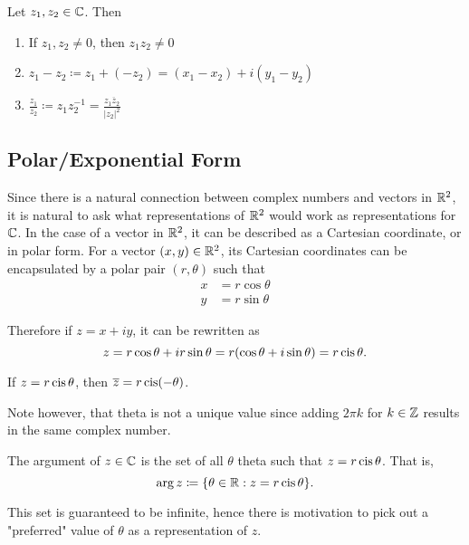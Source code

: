 \documentclass[../notes.tex]{subfiles}
\begin{document}
\begin{theorem}
    Let $z_1, z_2 \in \mathbb{C}$. Then
    \begin{enumerate}
        \item If $z_1, z_2 \neq 0$, then $z_1 z_2 \neq 0$
        \item $z_1 - z_2 \coloneq z_1 + (-z_2) = (x_1 - x_2) + i (y_1 - y_2)$
        \item $\displaystyle\frac{z_1}{z_2} \coloneq z_1 z_2^{-1} = \frac{z_1 \overline{z}_2}{|z_2|^2}$
    \end{enumerate}
\end{theorem}

\subsection{Polar/Exponential Form}

Since there is a natural connection between complex numbers and vectors in $\mathbb{R}^2$, it is natural to ask what representations of $\mathbb{R}^2$ would work as representations for $\mathbb{C}$. In the case of a vector in $\mathbb{R}^2$, it can be described as a Cartesian coordinate, or in polar form. For a vector $(x,y) \in \mathbb{R}^2$, its Cartesian coordinates can be encapsulated by a polar pair $(r, \theta)$ such that
\begin{align*}
    x &= r \cos \theta \\
    y &= r \sin \theta
\end{align*}

Therefore if $z = x + iy$, it can be rewritten as
\[
    z = r \cos \theta + i r \sin \theta = r (\cos \theta + i \sin \theta) = r \operatorname{cis} \theta
.\]
\begin{remark}
    If $z = r \operatorname{cis} \theta$, then $\overline{z} = r \operatorname{cis}(-\theta)$.
\end{remark}

Note however, that theta is not a unique value since adding $2 \pi k$ for $k \in \mathbb{Z}$ results in the same complex number.

\begin{definition}[Argument]
    The argument of $z \in \mathbb{C}$ is the set of all $\theta$ theta such that $z = r \operatorname{cis} \theta$. That is,
    \[
        \arg z \coloneq \qty{\theta \in \mathbb{R}: z = r \operatorname{cis}\theta}
    .\]
\end{definition}

This set is guaranteed to be infinite, hence there is motivation to pick out a "preferred" value of $\theta$ as a representation of $z$.
\end{document}
